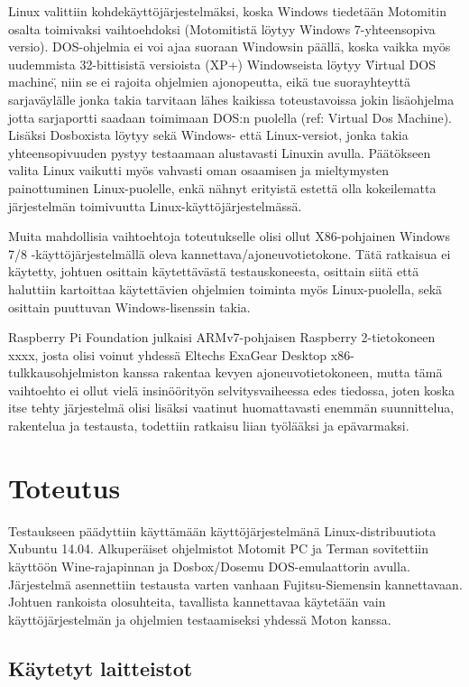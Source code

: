 \documentclass[11pt,a4paper,oneside,article]{memoir}
\begin{document}
Linux valittiin kohdekäyttöjärjestelmäksi, koska Windows tiedetään Motomitin osalta toimivaksi vaihtoehdoksi (Motomitistä löytyy Windows 7-yhteensopiva versio). DOS-ohjelmia ei voi ajaa suoraan Windowsin päällä, koska vaikka myös uudemmista 32-bittisistä versioista (XP+) Windowseista löytyy \"Virtual DOS machine\", niin se ei rajoita ohjelmien ajonopeutta, eikä tue suorayhteyttä sarjaväylälle jonka takia tarvitaan lähes kaikissa toteustavoissa jokin lisäohjelma jotta sarjaportti saadaan toimimaan DOS:n puolella (ref: Virtual Dos Machine). Lisäksi Dosboxista löytyy sekä Windows- että Linux-versiot, jonka takia yhteensopivuuden pystyy testaamaan alustavasti Linuxin avulla. Päätökseen valita Linux vaikutti myös vahvasti oman osaamisen ja mieltymysten painottuminen Linux-puolelle, enkä nähnyt erityistä estettä olla kokeilematta järjestelmän toimivuutta Linux-käyttöjärjestelmässä.

Muita mahdollisia vaihtoehtoja toteutukselle olisi ollut X86-pohjainen Windows 7/8 -käyttöjärjestelmällä oleva kannettava/ajoneuvotietokone. Tätä ratkaisua ei käytetty, johtuen osittain käytettävästä testauskoneesta, osittain siitä että haluttiin kartoittaa käytettävien ohjelmien toiminta myös Linux-puolella, sekä osittain puuttuvan Windows-lisenssin takia.

Raspberry Pi Foundation julkaisi ARMv7-pohjaisen Raspberry 2-tietokoneen xxxx, josta olisi voinut yhdessä Eltechs ExaGear Desktop x86-tulkkausohjelmiston kanssa rakentaa kevyen ajoneuvotietokoneen, mutta tämä vaihtoehto ei ollut vielä insinöörityön selvitysvaiheessa edes tiedossa, joten koska itse tehty järjestelmä olisi lisäksi vaatinut huomattavasti enemmän suunnittelua, rakentelua ja testausta, todettiin ratkaisu liian työlääksi ja epävarmaksi.

\chapter{Toteutus}

Testaukseen päädyttiin käyttämään käyttöjärjestelmänä Linux-distribuutiota Xubuntu 14.04. Alkuperäiset ohjelmistot Motomit PC ja Terman sovitettiin käyttöön Wine-rajapinnan ja Dosbox/Dosemu DOS-emulaattorin avulla. Järjestelmä asennettiin testausta varten vanhaan Fujitsu-Siemensin kannettavaan. Johtuen rankoista olosuhteita, tavallista kannettavaa käytetään vain käyttöjärjestelmän ja ohjelmien testaamiseksi yhdessä Moton kanssa.

\section{Käytetyt laitteistot}
\end{document}
